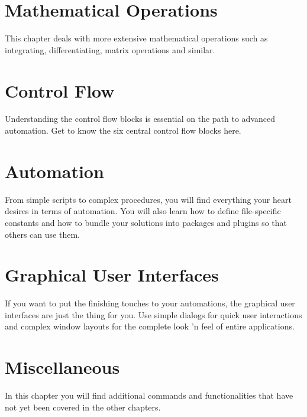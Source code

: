 \documentclass[DIV=17, parskip=half]{scrreprt}
\begin{document}
	\chapter{Mathematical Operations}
		This chapter deals with more extensive mathematical operations such as integrating, differentiating, matrix operations and similar.
		
		
		
		
		
		
		
		
		
	\chapter{Control Flow}
		Understanding the control flow blocks is essential on the path to advanced automation. Get to know the six central control flow blocks here.
		
		
		
		
		
		
		
	
	\chapter{Automation}
		From simple scripts to complex procedures, you will find everything your heart desires in terms of automation. You will also learn how to define file-specific constants and how to bundle your solutions into packages and plugins so that others can use them.
		
		
		
		
		
		
		
		
		
		
	
	\chapter{Graphical User Interfaces}
		If you want to put the finishing touches to your automations, the graphical user interfaces are just the thing for you. Use simple dialogs for quick user interactions and complex window layouts for the complete look 'n feel of entire applications.
		
		
		
	\chapter{Miscellaneous}
		In this chapter you will find additional commands and functionalities that have not yet been covered in the other chapters.
		
		
		
		
		
		
\end{document}
